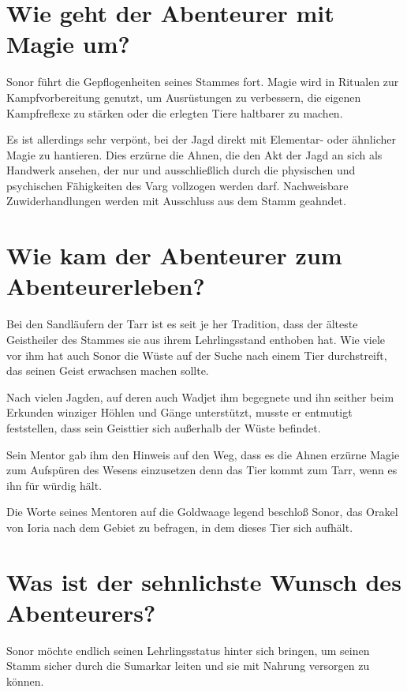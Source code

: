 	\section[Magie]{Wie geht der Abenteurer mit Magie um?}

	Sonor führt die Gepflogenheiten seines Stammes fort. Magie wird in
	Ritualen zur Kampfvorbereitung genutzt, um Ausrüstungen zu verbessern,
	die eigenen Kampfreflexe zu stärken oder die erlegten Tiere haltbarer zu
	machen.

	Es ist allerdings sehr verpönt, bei der Jagd direkt mit Elementar- oder
	ähnlicher Magie zu hantieren. Dies erzürne die Ahnen, die den Akt der Jagd an
	sich als Handwerk ansehen, der nur und ausschließlich durch die
	physischen und psychischen Fähigkeiten des Varg vollzogen werden darf.
	Nachweisbare Zuwiderhandlungen werden mit Ausschluss aus dem Stamm geahndet.


	\section[Schicksal]{Wie kam der Abenteurer zum Abenteurerleben?}

	Bei den Sandläufern der Tarr ist es seit je her Tradition, dass der
	älteste Geistheiler des Stammes sie aus ihrem Lehrlingsstand enthoben
	hat. Wie viele vor ihm hat auch Sonor die Wüste auf der Suche nach einem Tier
	durchstreift, das seinen Geist erwachsen machen sollte. 

	Nach vielen Jagden, auf deren auch Wadjet ihm begegnete und ihn seither
	beim Erkunden winziger Höhlen und Gänge unterstützt, musste er entmutigt
	feststellen, dass sein Geisttier sich außerhalb der Wüste befindet.

	Sein Mentor gab ihm den Hinweis auf den Weg, dass es die Ahnen erzürne
	Magie zum Aufspüren des Wesens einzusetzen denn das Tier kommt zum Tarr,
	wenn es ihn für würdig hält.

	Die Worte seines Mentoren auf die Goldwaage legend beschloß Sonor, das
	Orakel von Ioria nach dem Gebiet zu befragen, in dem dieses Tier sich
	aufhält.


	\section[Antrieb]{Was ist der sehnlichste Wunsch des Abenteurers?}

	Sonor möchte endlich seinen Lehrlingsstatus hinter sich bringen, um
	seinen Stamm sicher durch die Sumarkar leiten und sie mit Nahrung
	versorgen zu können.

